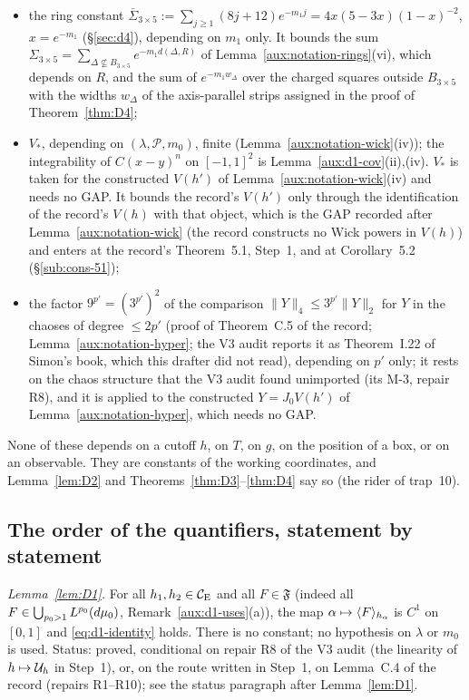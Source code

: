\begin{itemize}
\begin{itemize}
\item the ring constant
$\overline\Sigma_{3\times5}:=\sum_{j\ge1}(8j+12)e^{-m_1j}=4x(5-3x)(1-x)^{-2}$, $x=e^{-m_1}$
(\S\ref{sec:d4}), depending on $m_1$ only. It bounds the sum
$\Sigma_{3\times5}=\sum_{\Delta\not\subseteq B_{3\times5}}e^{-m_1d(\Delta,R)}$ of
Lemma~\ref{aux:notation-rings}(vi), which depends on $R$, and the sum of $e^{-m_1w_\Delta}$
over the charged squares outside $B_{3\times5}$ with the widths $w_\Delta$ of the axis-parallel
strips assigned in the proof of Theorem~\ref{thm:D4};
\item $V_*$, depending on $(\lambda,\mathscr P,m_0)$, finite (Lemma~\ref{aux:notation-wick}(iv));
the integrability of $C(x-y)^n$ on $[-1,1]^2$ is Lemma~\ref{aux:d1-cov}(ii),(iv).  $V_*$ is
taken for the constructed $V(h')$ of Lemma~\ref{aux:notation-wick}(iv) and needs no GAP.  It
bounds the record's $V(h')$ only through the identification of the record's $V(h)$ with that
object, which is the GAP recorded after Lemma~\ref{aux:notation-wick} (the record constructs no
Wick powers in $V(h)$) and enters at the record's Theorem~5.1, Step~1, and at Corollary~5.2
(\S\ref{sub:cons-51});
\item the factor $9^{p'}=(3^{p'})^2$ of the comparison $\|Y\|_4\le3^{p'}\|Y\|_2$ for $Y$ in the
chaoses of degree $\le2p'$ (proof of Theorem~C.5 of the record; Lemma~\ref{aux:notation-hyper};
the V3 audit reports it as Theorem~I.22 of Simon's book, which this drafter did not read),
depending on $p'$ only; it rests on the chaos structure that the V3 audit found unimported
(its M-3, repair R8), and it is applied to the constructed $Y=J_0V(h')$ of
Lemma~\ref{aux:notation-hyper}, which needs no GAP.
\end{itemize}
\end{itemize}
None of these depends on a cutoff $h$, on $T$, on $g$, on the position of a box, or on an
observable. They are constants of the working coordinates, and Lemma~\ref{lem:D2} and
Theorems~\ref{thm:D3}--\ref{thm:D4} say so (the rider of trap~10).

\subsection{The order of the quantifiers, statement by statement}\label{sec:quant-order}

\emph{Lemma~\ref{lem:D1}.} For all $h_1,h_2\in\mathcal{C}_{\mathrm E}$ and all $F\in\mathfrak F$ (indeed all
$F\in\bigcup_{p_0>1}L^{p_0}(d\mu_0)$, Remark~\ref{aux:d1-uses}(a)), the map
$\alpha\mapsto\langle F\rangle_{h_\alpha}$ is $C^1$ on $[0,1]$ and \eqref{eq:d1-identity} holds. There is
no constant; no hypothesis on $\lambda$ or $m_0$ is used.  Status: proved, conditional on repair
R8 of the V3 audit (the linearity of $h\mapsto\mathcal U_h$ in Step~1), or, on the route written in
Step~1, on Lemma~C.4 of the record (repairs R1--R10); see the status paragraph after
Lemma~\ref{lem:D1}.

